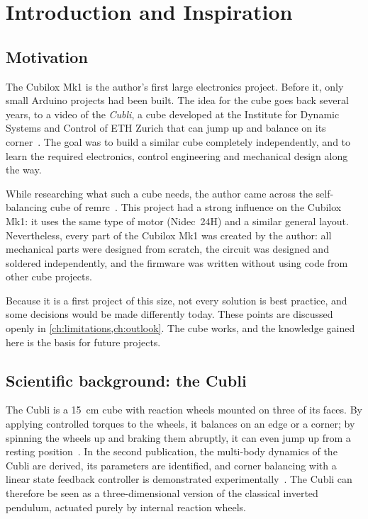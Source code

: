 \chapter{Introduction and Inspiration}
\label{ch:introduction}

\section{Motivation}

The Cubilox Mk1 is the author's first large electronics project. Before it, only small Arduino
projects had been built. The idea for the cube goes back several years, to a video of the
\emph{Cubli}, a cube developed at the Institute for Dynamic Systems and Control of ETH Zurich that
can jump up and balance on its corner~\cite{gajamohan2012cubli,gajamohan2013cubli}. The goal was
to build a similar cube completely independently, and to learn the required electronics, control
engineering and mechanical design along the way.

While researching what such a cube needs, the author came across the self-balancing cube of
remrc~\cite{remrc_cube}. This project had a strong influence on the Cubilox Mk1: it uses the
same type of motor (Nidec~24H) and a similar general layout. Nevertheless, every part of the
Cubilox Mk1 was created by the author: all mechanical parts were designed from scratch, the
circuit was designed and soldered independently, and the firmware was written without using code
from other cube projects.

Because it is a first project of this size, not every solution is best practice, and some
decisions would be made differently today. These points are discussed openly in
\cref{ch:limitations,ch:outlook}. The cube works, and the knowledge gained here is the basis for
future projects.

\section{Scientific background: the Cubli}

The Cubli is a \SI{15}{cm} cube with reaction wheels mounted on three of its faces. By applying
controlled torques to the wheels, it balances on an edge or a corner; by spinning the wheels up and
braking them abruptly, it can even jump up from a resting position~\cite{gajamohan2012cubli}. In
the second publication, the multi-body dynamics of the Cubli are derived, its parameters are
identified, and corner balancing with a linear state feedback controller is demonstrated
experimentally~\cite{gajamohan2013cubli}. The Cubli can therefore be seen as a three-dimensional
version of the classical inverted pendulum, actuated purely by internal reaction wheels.

